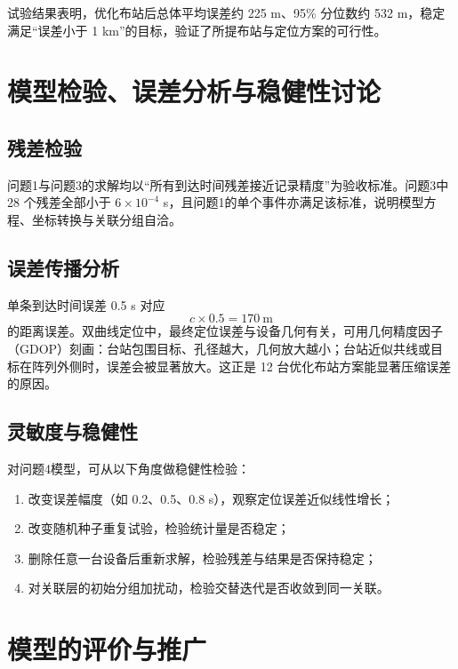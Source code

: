 \documentclass[12pt,a4paper]{article}
\begin{document}
试验结果表明，优化布站后总体平均误差约 225 m、95\% 分位数约 532 m，稳定满足“误差小于 1 km”的目标，验证了所提布站与定位方案的可行性。

\section{模型检验、误差分析与稳健性讨论}

\subsection{残差检验}

问题1与问题3的求解均以“所有到达时间残差接近记录精度”为验收标准。问题3中 28 个残差全部小于 $6\times10^{-4}$ s，且问题1的单个事件亦满足该标准，说明模型方程、坐标转换与关联分组自洽。

\subsection{误差传播分析}

单条到达时间误差 0.5 s 对应
\[
c\times0.5=170\ \mathrm{m}
\]
的距离误差。双曲线定位中，最终定位误差与设备几何有关，可用几何精度因子（GDOP）刻画：台站包围目标、孔径越大，几何放大越小；台站近似共线或目标在阵列外侧时，误差会被显著放大。这正是 12 台优化布站方案能显著压缩误差的原因。

\subsection{灵敏度与稳健性}

对问题4模型，可从以下角度做稳健性检验：
\begin{enumerate}[label=\arabic*.]
  \item 改变误差幅度（如 0.2、0.5、0.8 s），观察定位误差近似线性增长；
  \item 改变随机种子重复试验，检验统计量是否稳定；
  \item 删除任意一台设备后重新求解，检验残差与结果是否保持稳定；
  \item 对关联层的初始分组加扰动，检验交替迭代是否收敛到同一关联。
\end{enumerate}

\section{模型的评价与推广}
\end{document}
